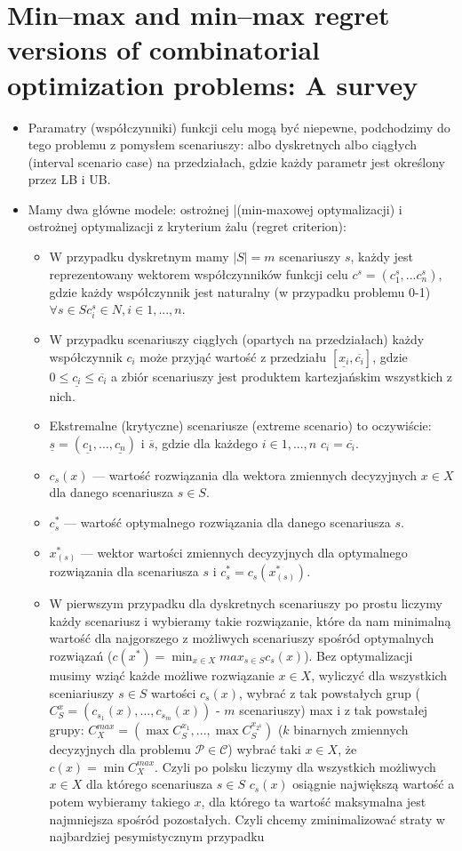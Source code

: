 \chapter{Min–max and min–max regret versions of combinatorial optimization problems: A survey}
\thispagestyle{chapterBeginStyle}


\begin{itemize}
	\item Paramatry (współczynniki) funkcji celu mogą być niepewne, podchodzimy do tego problemu z pomysłem scenariuszy: albo dyskretnych albo ciągłych (interval scenario case) na przedziałach, gdzie każdy parametr jest określony przez LB i UB.
	\item Mamy dwa główne modele: ostrożnej |(min-maxowej optymalizacji) i ostrożnej optymalizacji z kryterium żalu (regret criterion):
	\begin{itemize}
		\item W przypadku dyskretnym mamy $|S| = m$ scenariuszy $s$, każdy jest reprezentowany wektorem współczynników funkcji celu $c^{s} = (c_1^s , ... c_n^s)$, gdzie każdy współczynnik jest naturalny (w przypadku problemu 0-1) $\forall s \in S c_i^s \in N, i \in 1, ..., n$.
		\item W przypadku scenariuszy ciągłych (opartych na przedziałach) każdy współczynnik $c_i$ może przyjąć wartość z przedziału $[\underline{x_i}, \overline{c_i}]$, gdzie $ 0 \leqslant \underline{c_i} \leqslant \overline{c_i}$ a zbiór scenariuszy jest produktem kartezjańskim wszystkich z nich.
		\item Ekstremalne (krytyczne) scenariusze (extreme scenario) to oczywiście: $\underline{s} = ( \underline{c_1}, ..., \underline{c_n})$ i $\overline{s}$, gdzie dla każdego $i \in 1, ..., n$ $c_i = \overline{c_i}$.
		\item $c_s(x)$ --- wartość rozwiązania dla wektora zmiennych decyzyjnych $x \in X$ dla danego scenariusza $s \in S$.
		\item $c_s^\ast$ --- wartość optymalnego rozwiązania dla danego scenariusza $s$.
		\item $x^\ast_{\left( s \right)}$ --- wektor wartości zmiennych decyzyjnych dla optymalnego rozwiązania dla scenariusza $s$ i ${c_s^\ast} = c_s(x^\ast_{\left( s \right)})$.
		\item W pierwszym przypadku dla dyskretnych scenariuszy po prostu liczymy każdy scenariusz i wybieramy takie rozwiązanie, które da nam minimalną wartość dla najgorszego z możliwych scenariuszy spośród optymalnych rozwiązań ($c(x^\ast) = \min_{x \in X} max_{s \in S} c_{s}(x)$). Bez optymalizacji musimy wziąć każde możliwe rozwiązanie $x \in X$, wyliczyć dla wszystkich sceniariuszy $s \in S$ wartości $c_s(x)$, wybrać z tak powstałych grup ($C_S^x = (c_{s_1}(x), ..., c_{s_m}(x))$ - $m$ scenariuszy) max i z tak powstałej grupy: $C_X^{max} = (\max{C_S^{x_1}}, ..., \max{C_S^{x_{2^k}}})$ ($k$ binarnych zmiennych decyzyjnych dla problemu $\mathscr{P} \in \mathscr{C}$) wybrać taki $x \in X$, że $c(x) = \min{C_X^{max}}$. Czyli po polsku liczymy dla wszystkich możliwych $x \in X$ dla którego scenariusza $s \in S$ $c_s(x)$ osiągnie największą wartość a potem wybieramy takiego $x$, dla którego ta wartość maksymalna jest najmniejsza spośród pozostałych. Czyli chcemy zminimalizować straty w najbardziej pesymistycznym przypadku

\end{itemize}
\end{itemize}
